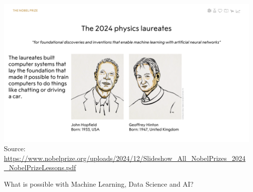 \documentclass[aspectratio=169,xcolor=dvipsnames,svgnames,x11names,fleqn]{beamer}
\begin{document}
\begin{frame}{}

  \begin{center}
    \includegraphics[width=.8\linewidth]{figures/nobel_physics_2024.pdf}  
    {\tiny Source: \url{https://www.nobelprize.org/uploads/2024/12/Slideshow_All_NobelPrizes_2024_NobelPrizeLessons.pdf}} 

  \end{center}
  
\end{frame}

\begin{subsectionframe}{What is possible with Machine Learning, Data Science and AI?}
\end{subsectionframe}
\end{document}
